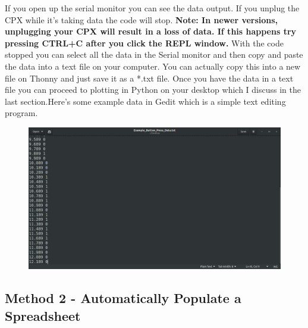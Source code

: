 If you open up the serial monitor you can see the data output. If you
unplug the CPX while it’s taking data the code will stop. {\bf Note: In
newer versions, unplugging your CPX will result in a loss of data. If
this happens try pressing CTRL+C after you click the REPL window.} With
the code stopped you can select all the data in the Serial monitor and
then copy and paste the data into a text file on your computer. You
can actually copy this into a new file on Thonny and just save it as a
*.txt file. Once you have the data in a text file you can proceed to
plotting in Python on your desktop which I discuss in the last
section.Here’s some example data in Gedit which is a simple text
editing program.
\begin{figure}[H]
  \begin{center}
    \includegraphics[width=\textwidth]{Figures/Gedit_Data.png}
  \end{center}
\end{figure}

\subsection{Method 2 - Automatically Populate a Spreadsheet}

